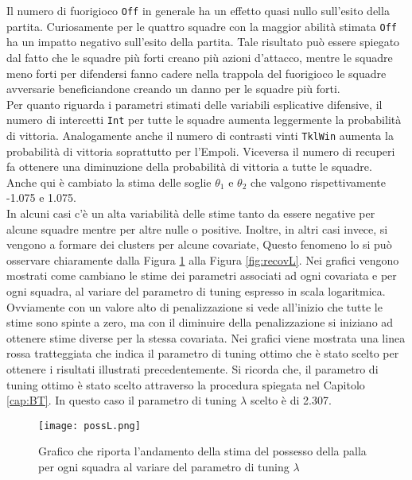 Il numero di fuorigioco \texttt{Off} in generale ha un effetto quasi nullo sull'esito della partita. Curiosamente per le quattro squadre con la maggior abilità stimata \texttt{Off} ha un impatto negativo sull'esito della partita. Tale risultato può essere spiegato dal fatto che le squadre più forti creano più azioni d'attacco, mentre le squadre meno forti per difendersi fanno cadere nella trappola del fuorigioco le squadre avversarie beneficiandone creando un danno per le squadre più forti.\\
Per quanto riguarda i parametri stimati delle variabili esplicative difensive, il numero di intercetti \texttt{Int} per tutte le squadre aumenta leggermente la probabilità di vittoria. Analogamente anche il numero di contrasti vinti \texttt{TklWin} aumenta la probabilità di vittoria soprattutto per l'Empoli. Viceversa il numero di recuperi fa ottenere una diminuzione della probabilità di vittoria a tutte le squadre.\\
Anche qui è cambiato la stima delle soglie $\theta_1$ e $\theta_2$ che valgono rispettivamente -1.075 e 1.075.\\
In alcuni casi c'è un alta variabilità delle stime tanto da essere negative per alcune squadre mentre per altre nulle o positive. Inoltre, in altri casi invece, si vengono a formare dei clusters per alcune covariate,  Questo fenomeno lo si può osservare chiaramente dalla Figura \ref{fig:possL} alla Figura \ref{fig:recovL}. Nei grafici vengono mostrati come cambiano le stime dei parametri associati ad ogni covariata e per ogni squadra, al variare del parametro di tuning espresso in scala logaritmica. Ovviamente con un valore alto di penalizzazione si vede all'inizio che tutte le stime sono spinte a zero, ma con il diminuire della penalizzazione si iniziano ad ottenere stime diverse per la stessa covariata. Nei grafici viene mostrata una linea rossa tratteggiata che indica il parametro di tuning ottimo che è stato scelto per ottenere i risultati illustrati precedentemente. Si ricorda che, il parametro di tuning ottimo è stato scelto attraverso la procedura spiegata nel Capitolo \ref{cap:BT}. In questo caso il parametro di tuning $\lambda$ scelto è di 2.307.\\

\begin{figure}[htbp]
	\begin{center}
		\texttt{[image: possL.png]}
		\caption{Grafico che riporta l'andamento della stima del possesso della palla per ogni squadra al variare del parametro di tuning $\lambda$} \label{fig:possL}
	\end{center}
\end{figure}

